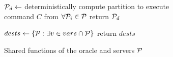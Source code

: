 \begin{algorithm}[h!]
  \footnotesize

  \begin{distribalgo}[1]
    \STATE $\mathcal{P}_d \leftarrow$ deterministically compute partition to execute\\ \hspace{8mm} command $C$ from $\forall \mathcal{P}_i \in \mathcal{P}$
    \STATE return $\mathcal{P}_d$
  \ENDINDENT


  \vspace{1.0mm}
    \STATE $dests \leftarrow \{ \mathcal{P} : \exists v \in vars \cap \mathcal{P} \}$
    \STATE return $dests$
  \ENDINDENT

  \vspace{1.5mm}


  \caption{Shared functions of the oracle and servers $\mathcal{P}$}
  \label{alg:dynastar-share_algo}
  \end{distribalgo}
  \end{algorithm}
